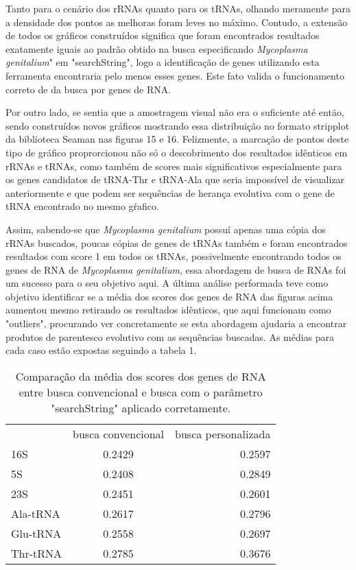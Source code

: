 \documentclass[brazilian,12pt,a4paper,final]{article}
\begin{document}
	Tanto para o cenário dos rRNAs quanto para os tRNAs, olhando meramente para a densidade dos pontos as melhoras foram leves no máximo. Contudo, a extensão de todos os gráficos construídos significa que foram encontrados resultados exatamente iguais ao padrão obtido na busca especificando \textit{Mycoplasma genitalium}" em "searchString", logo a identificação de genes utilizando esta ferramenta encontraria pelo menos esses genes. Este fato valida o funcionamento correto de da busca por genes de RNA.
	
	\vspace{0.5cm}
	
	Por outro lado, se sentia que a amostragem visual não era o suficiente até então, sendo construídos novos gráficos mostrando essa distribuição no formato stripplot da biblioteca Seaman nas figuras 15 e 16. Felizmente, a marcação de pontos deste tipo de gráfico proprorcionou não só o descobrimento dos resultados idênticos em rRNAs e tRNAs, como também de scores mais significativos especialmente para os genes candidatos de tRNA-Thr e tRNA-Ala que seria impossível de visualizar anteriormente e que podem ser sequências de herança evolutiva com o gene de tRNA encontrado no mesmo gŕafico.
	
	\vspace{0.5cm}
	
	Assim, sabendo-se que \textit{Mycoplasma genitalium} possuí apenas uma cópia dos rRNAs buscados, poucas cópias de genes de tRNAs também e foram encontrados resultados com score 1 em todos os tRNAs, possivelmente encontrando todos os genes de RNA de \textit{Mycoplasma genitalium}, essa abordagem de busca de RNAs foi um sucesso para o seu objetivo aqui. A última análise performada teve como objetivo identificar se a média dos scores dos genes de RNA das figuras acima aumentou mesmo retirando os resultados idênticos, que aqui funcionam como "outliers", procurando ver concretamente se esta abordagem ajudaria a encontrar produtos de parentesco evolutivo com as sequências buscadas. As médias para cada caso estão expostas seguindo a tabela 1.
	
	
	\begin{table*}[b]
		\centering
		\begin{tabular}{lcr}
			& busca convencional & busca personalizada \\
			16S & 0.2429 & 0.2597 \\
			5S & 0.2408 & 0.2849 \\
			23S & 0.2451 & 0.2601 \\
			Ala-tRNA & 0.2617 & 0.2796 \\
			Glu-tRNA & 0.2558 & 0.2697 \\
			Thr-tRNA & 0.2785 & 0.3676 \\
		\end{tabular}
		\caption{Comparação da média dos scores dos genes de RNA entre busca convencional e busca com o parâmetro "searchString" aplicado corretamente.}
		\label{tab:1}
	\end{table*}
	
\end{document}
